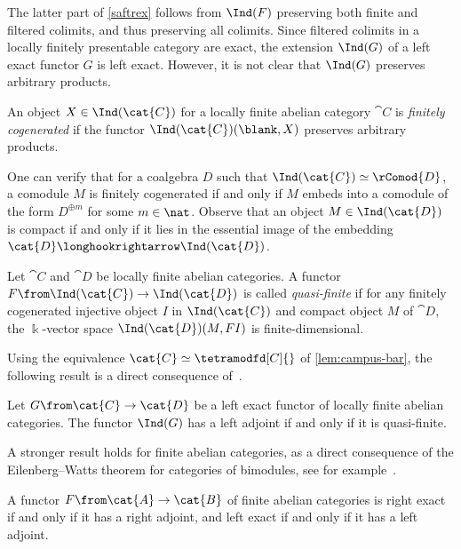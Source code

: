 The latter part of \cref{saftrex} follows from \(\Ind(F)\) preserving both finite and filtered colimits, and thus preserving all colimits.
Since filtered colimits in a locally finitely presentable category are exact,
the extension \(\Ind(G)\) of a left exact functor \(G\) is left exact.
However, it is not clear that \(\Ind(G)\) preserves arbitrary products.

\begin{definition}
  An object \(X \in \Ind(\cat{C})\)
  for a locally finite abelian category \(\cat{C}\)
  is \emph{finitely cogenerated}
  if the functor \(\Ind(\cat{C})(\blank,X)\) preserves arbitrary products.
\end{definition}

One can verify that for a coalgebra \(D\) such that \(\Ind(\cat{C}) \simeq \rComod{D}\),
a comodule \(M\) is finitely cogenerated if and only if \(M\) embeds into a comodule of the form \(D^{\oplus m}\) for some \(m \in \nat\).
Observe that an object \(M \in \Ind(\cat{D})\) is compact if and only if it lies in the essential image of the embedding \(\cat{D} \longhookrightarrow \Ind(\cat{D})\).

\begin{definition}\label{qfFunctor}
  Let \(\cat{C}\) and \(\cat{D}\) be locally finite abelian categories.
  A functor \(F\from \Ind(\cat{C}) \to \Ind(\cat{D})\) is called \emph{quasi-finite} if
  for any finitely cogenerated injective object \(I\) in \(\Ind(\cat{C})\) and compact object \(M\) of \(\cat{D}\),
  the \(\Bbbk\)\hyp{}vector space \(\Ind(\cat{D})(M, FI)\) is finite\hyp{}dimensional.
\end{definition}

Using the equivalence \(\cat{C} \simeq \tetramodfd[C]{}\) of \cref{lem:campus-bar},
the following result is a direct consequence of~\cite[Proposition~1.3]{takeuchi77:morit}.

\begin{proposition}\label{locallyfiniteadjoints}
  Let \(G\from \cat{C} \to \cat{D}\) be a left exact functor of locally finite abelian categories.
  The functor \(\Ind(G)\) has a left adjoint if and only if it is quasi-finite.
\end{proposition}

A stronger result holds for finite abelian categories,
as a direct consequence of the Eilenberg--Watts theorem for categories of bimodules,
see for example~\cite[Lemma~2.1]{fuchs20:eilen-watts-radfor-s}.

\begin{proposition}\label{finiteadjoints}
  A functor \(F\from \cat{A} \to \cat{B}\) of finite abelian categories
  is right exact if and only if it has a right adjoint,
  and left exact if and only if it has a left adjoint.
\end{proposition}

